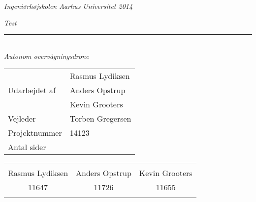 \thispagestyle{empty}

\begin{center}
\textsl{Ingeniørhøjskolen Aarhus Universitet 2014 } \\ \vspace{0.5cm}

\phantom{hul}
\phantom{hul}
\phantom{hul}
\phantom{hul}
\phantom{hul}
\phantom{hul}
\phantom{hul}

\textsl{\HUGE Test } \\ \vspace{0cm}
\rule{15cm}{0.5mm}  \\ \vspace{0.5cm}
\textsl{\LARGE Autonom overvågningsdrone } \\ \vspace{0.5cm}

\vspace{2.5cm}

\begin{table}[h]
\begin{tabular}{l|l}
\hline

 						&	Rasmus Lydiksen 				\\
Udarbejdet af \hspace{5cm} &	Anders Opstrup  \hspace{3.8cm}	\\
 						&  	Kevin Grooters					\\ \hline

Vejleder				&	Torben Gregersen 				\\ \hline
Projektnummer			&	14123 			 				\\ \hline
Antal sider				&	\pageref{LastPage} 				\\ \hline
\end{tabular}
\end{table}

\vspace{8cm}

\begin{table}[H]
	\centering
		\begin{tabular}{c c c}
			\underline{\phantom{mmmmmmmmmmmmmm}} & \underline{\phantom{mmmmmmmmmmmmmm}} & \underline{\phantom{mmmmmmmmmmmmmm}} \\
			Rasmus Lydiksen			& Anders Opstrup 		& Kevin Grooters 			\\
			11647					& 11726					& 11655\\
			&&\\												
		\end{tabular}
\end{table}
\end{center}